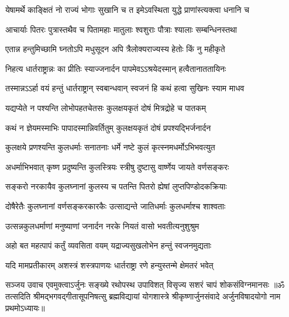 \twolineshloka
{येषामर्थे काङ्क्षितं नो राज्यं भोगाः सुखानि च}
{त इमेऽवस्थिता युद्धे प्राणांस्त्यक्त्वा धनानि च}%

\twolineshloka
{आचार्याः पितरः पुत्रास्तथैव च पितामहाः}
{मातुलाः श्वशुराः पौत्राः श्यालाः सम्बन्धिनस्तथा}%

\twolineshloka
{एतान्न हन्तुमिच्छामि घ्नतोऽपि मधुसूदन}
{अपि त्रैलोक्यराज्यस्य हेतोः किं नु महीकृते}%

\twolineshloka
{निहत्य धार्तराष्ट्रान्नः का प्रीतिः स्याज्जनार्दन}
{पापमेवऽऽश्रयेदस्मान् हत्वैतानाततायिनः}%

\twolineshloka
{तस्मान्नऽऽर्हा वयं हन्तुं धार्तराष्ट्रान् स्वबान्धवान्}
{स्वजनं हि कथं हत्वा सुखिनः स्याम माधव}%

\twolineshloka
{यद्यप्येते न पश्यन्ति लोभोपहतचेतसः}
{कुलक्षयकृतं दोषं मित्रद्रोहे च पातकम्}%

\twolineshloka
{कथं न ज्ञेयमस्माभिः पापादस्मान्निवर्तितुम्}
{कुलक्षयकृतं दोषं प्रपश्यद्भिर्जनार्दन}%

\twolineshloka
{कुलक्षये प्रणश्यन्ति कुलधर्माः सनातनाः}
{धर्मे नष्टे कुलं कृत्स्नमधर्मोऽभिभवत्युत}%

\twolineshloka
{अधर्माभिभवात् कृष्ण प्रदुष्यन्ति कुलस्त्रियः}
{स्त्रीषु दुष्टासु वार्ष्णेय जायते वर्णसङ्करः}%

\twolineshloka
{सङ्करो नरकायैव कुलघ्नानां कुलस्य च}
{पतन्ति पितरो ह्येषां लुप्तपिण्डोदकक्रियाः}%

\twolineshloka
{दोषैरेतैः कुलघ्नानां वर्णसङ्करकारकैः}
{उत्साद्यन्ते जातिधर्माः कुलधर्माश्च शाश्वताः}%

\twolineshloka
{उत्सन्नकुलधर्माणां मनुष्याणां जनार्दन}
{नरके नियतं वासो भवतीत्यनुशुश्रुम}%

\twolineshloka
{अहो बत महत्पापं कर्तुं व्यवसिता वयम्}
{यद्राज्यसुखलोभेन हन्तुं स्वजनमुद्यताः}%

\twolineshloka
{यदि मामप्रतीकारम् अशस्त्रं शस्त्रपाणयः}
{धार्तराष्ट्रा रणे हन्युस्तन्मे क्षेमतरं भवेत्}%

{सञ्जय उवाच}
\twolineshloka
{एवमुक्त्वाऽर्जुनः सङ्ख्ये रथोपस्थ उपाविशत्}
{विसृज्य सशरं चापं शोकसंविग्नमानसः}%
{॥ॐ तत्सदिति श्रीमद्भगवद्गीतासूपनिषत्सु ब्रह्मविद्यायां योगशास्त्रे श्रीकृष्णार्जुनसंवादे अर्जुनविषादयोगो नाम प्रथमोऽध्यायः॥}
